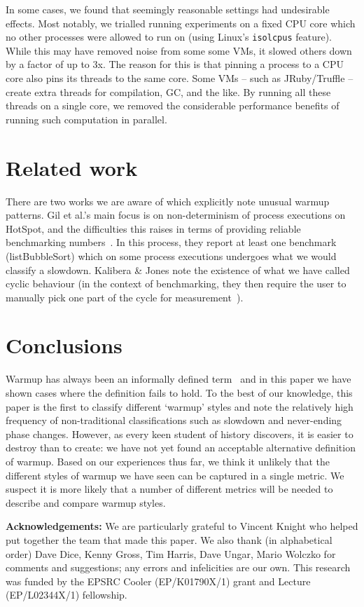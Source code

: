 \documentclass[preprint,numbers,10pt]{sigplanconf}
\newcommand{\kalibera}{Kalibera \& Jones\xspace}
\begin{document}
In some cases, we found that seemingly reasonable settings had undesirable
effects. Most notably, we trialled running experiments on a fixed CPU core which
no other processes were allowed to run on (using Linux's \texttt{isolcpus}
feature). While this may have removed noise from some some VMs,
it slowed others down by
a factor of up to 3x. The reason for this is that pinning a process to a CPU
core also pins its threads to the same core. Some VMs -- such as
JRuby/Truffle -- create extra threads for compilation, GC, and the like. By
running all these threads on a single core, we removed the considerable
performance benefits of running such computation in parallel.


\section{Related work}


There are two works we are aware of which explicitly note unusual warmup
patterns. Gil et al.'s main focus is on non-determinism of process executions on
HotSpot, and the difficulties this raises in terms of providing reliable
benchmarking numbers~\cite{gil11microbenchmark}. In this process, they report at
least one benchmark (listBubbleSort) which on some process executions undergoes what we
would classify a slowdown. \kalibera note the
existence of what we have called cyclic behaviour (in the context of benchmarking,
they then require the user to
manually pick one part of the cycle for measurement~\cite{kalibera13rigorous}).


\section{Conclusions}
\label{sec:conclusion}

Warmup has always been an informally defined term~\cite{seaton15phd} and in this
paper we have shown cases where the definition fails to hold.
To the best of our knowledge, this paper is the first to classify different
`warmup' styles and note the relatively high frequency of non-traditional
classifications such as slowdown and never-ending phase changes.
However, as every keen student of history discovers, it is easier to destroy than to
create: we have not yet found an acceptable alternative definition of warmup.
Based on our experiences thus far, we think it unlikely that the different
styles of warmup we have seen can be captured in a single metric. We suspect it
is more likely that a number of different metrics will be needed to describe and
compare warmup styles.

\textbf{Acknowledgements:} We are particularly grateful to Vincent Knight
who helped put together the team that made this paper. We also thank (in alphabetical order) Dave Dice, Kenny
Gross, Tim Harris, Dave Ungar, Mario Wolczko for comments and suggestions; any
errors and infelicities are our own. This research was funded by the EPSRC
Cooler (EP/K01790X/1) grant and Lecture (EP/L02344X/1) fellowship.



\end{document}

